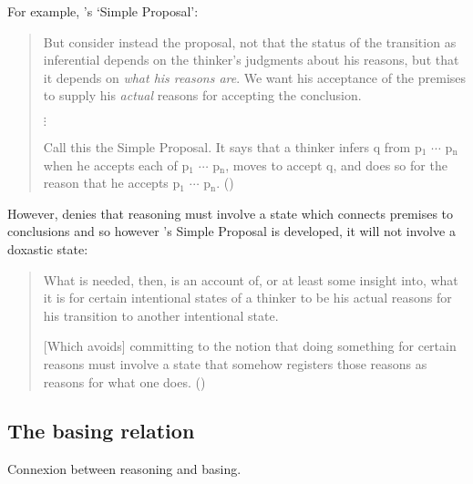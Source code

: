 \begin{note}
  For example, \citeauthor{Wright:2014tt}'s `Simple Proposal':
  \begin{quote}
    But consider instead the proposal, not that the status of the transition as inferential depends on the thinker's judgments about his reasons, but that it depends on \emph{what his reasons are}.
    We want his acceptance of the premises to supply his \emph{actual} reasons for accepting the conclusion.

    \mbox{}\hfill\(\vdots\)\hfill\mbox{}

    Call this the Simple Proposal.
    It says that a thinker infers q from p\(_{1}\) \(\cdots\) p\(_{\text{n}}\) when he accepts each of p\(_{1}\) \(\cdots\) p\(_{\text{n}}\), moves to accept q, and does so for the reason that he accepts p\(_{1}\) \(\cdots\) p\(_{\text{n}}\).\newline
      \mbox{}\hfill\mbox{(\Citeyear[33]{Wright:2014tt})}
    \end{quote}

    However, \citeauthor{Wright:2014tt} denies that reasoning must involve a state which connects premises to conclusions and so however \citeauthor{Wright:2014tt}'s Simple Proposal is developed, it will not involve a doxastic state:

    \begin{quote}
      What is needed, then, is an account of, or at least some insight into, what it is for certain intentional states of a thinker to be his actual reasons for his transition to another intentional state.

      [Which avoids] committing to the notion that doing something for certain reasons must involve a state that somehow registers those reasons as reasons for what one does.%
      \mbox{}\hfill\mbox{(\Citeyear[34]{Wright:2014tt})}
    \end{quote}
\end{note}

\subsection{The basing relation}

\begin{note}
  Connexion between reasoning and basing.
\end{note}

